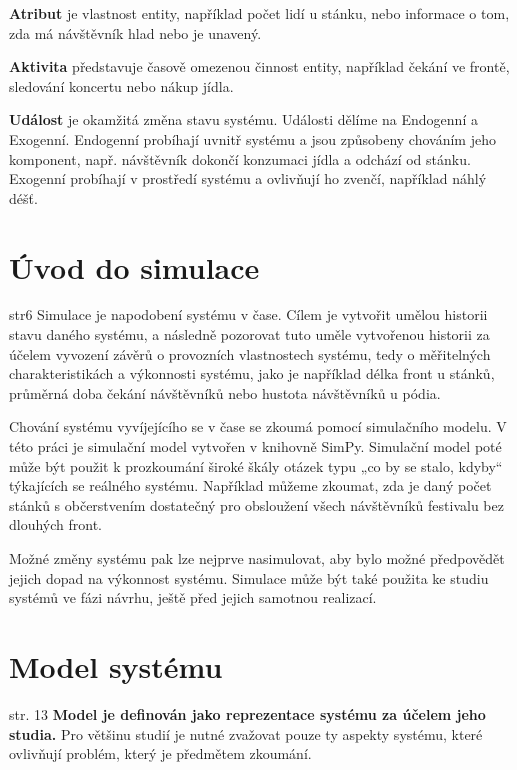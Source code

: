 \documentclass[12pt,a4paper]{article}
\begin{document}
\noindent \textbf{Atribut} je vlastnost entity, například počet lidí u stánku, nebo informace o tom, zda má návštěvník hlad nebo je unavený. 

\noindent \textbf{Aktivita} představuje časově omezenou činnost entity, například čekání ve frontě, sledování koncertu nebo nákup jídla.

\noindent \textbf{Událost} je okamžitá změna stavu systému. Události dělíme na Endogenní a Exogenní. Endogenní probíhají uvnitř systému a jsou způsobeny chováním jeho komponent, např. návštěvník dokončí konzumaci jídla a odchází od stánku. Exogenní probíhají v prostředí systému a ovlivňují ho zvenčí, například náhlý déšť.


\section{Úvod do simulace}  str6
Simulace je napodobení systému v čase. Cílem je vytvořit umělou historii stavu daného systému, a následně pozorovat tuto uměle vytvořenou historii za účelem vyvození závěrů o provozních vlastnostech systému, tedy o měřitelných charakteristikách a výkonnosti systému, jako je například délka front u stánků, průměrná doba čekání návštěvníků nebo hustota návštěvníků u pódia. 

Chování systému vyvíjejícího se v čase se zkoumá pomocí simulačního modelu. V této práci je simulační model vytvořen v knihovně SimPy. Simulační model poté může být použit k prozkoumání široké škály otázek typu „co by se stalo, kdyby“ týkajících se reálného systému. Například můžeme zkoumat, zda je daný počet stánků s občerstvením dostatečný pro obsloužení všech návštěvníků festivalu bez dlouhých front. 

Možné změny systému pak lze nejprve nasimulovat, aby bylo možné předpovědět jejich dopad na výkonnost systému. Simulace může být také použita ke studiu systémů ve fázi návrhu, ještě před jejich samotnou realizací.

\section{Model systému} str. 13
{\bf Model je definován jako reprezentace systému za účelem jeho studia.} Pro většinu studií je nutné zvažovat pouze ty aspekty systému, které ovlivňují problém, který je předmětem zkoumání. 
\end{document}
